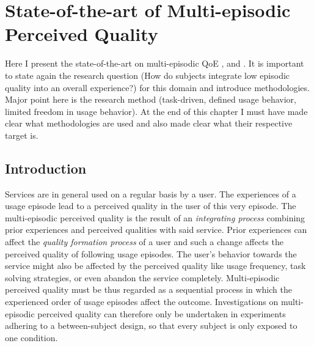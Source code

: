 \chapter{State-of-the-art of Multi-episodic Perceived Quality}\label{chap:05}
\begin{chapter-abstract}
Here I present the state-of-the-art on multi-episodic QoE \cite{duncanson_average_1969}, and \cite{moller_single-call_2011}.
It is important to state again the research question (How do subjects integrate low episodic quality into an overall experience?) for this domain and introduce methodologies.
Major point here is the research method (task-driven, defined usage behavior, limited freedom in usage behavior).
At the end of this chapter I must have made clear what methodologies are used and also made clear what their respective target is.
\end{chapter-abstract}

\section{Introduction}
Services are in general used on a regular basis by a user.
The experiences of a usage episode lead to a perceived quality in the user of this very episode. %
The multi-episodic perceived quality is the result of an \emph{integrating process} combining prior experiences and perceived qualities with said service.
Prior experiences can affect the \emph{quality formation process} of a user and such a change affects the perceived quality of following usage episodes.
The user's behavior towards the service might also be affected by the perceived quality like usage frequency, task solving strategies, or even abandon the service completely.
Multi-episodic perceived quality must be thus regarded as a sequential process in which the experienced order of usage episodes affect the outcome. %
Investigations on multi-episodic perceived quality can therefore only be undertaken in experiments adhering to a between-subject design, so that every subject is only exposed to one condition.

